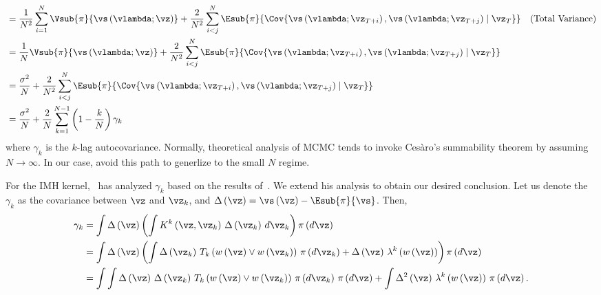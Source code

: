 \begin{proofEnd}
\begin{align}
{  } \nonumber\\
  &= \frac{1}{N^2} \sum_{i=1}^N \Vsub{\pi}{ \vs\left(\vlambda; \vz\right) } 
 + \frac{2}{N^2}  \sum_{i < j}^N \Esub{\pi}{ \Cov{ \vs\left(\vlambda; \vz_{T+i}\right), \vs\left(\vlambda; \vz_{T+j}\right) \mid  \vz_T }
  }&\text{(Total Variance)} \nonumber\\
  &= \frac{1}{N} \Vsub{\pi}{ \vs\left(\vlambda; \vz\right) } 
 + \frac{2}{N^2}  \sum_{i < j}^N \Esub{\pi}{ \Cov{ \vs\left(\vlambda; \vz_{T+i}\right), \vs\left(\vlambda; \vz_{T+j}\right) \mid  \vz_T }
  } \nonumber\\
  &= \frac{\sigma^2}{N}
 + \frac{2}{N^2}  \sum_{i < j}^N \Esub{\pi}{ \Cov{ \vs\left(\vlambda; \vz_{T+i}\right), \vs\left(\vlambda; \vz_{T+j}\right) \mid  \vz_T }
  } \nonumber\\
  &= \frac{\sigma^2}{N}
 + \frac{2}{N} \sum_{k=1}^{N-1} \left(1 - \frac{k}{N}\right) \gamma_k \label{eq:seq_cov}
\end{align}
where \(\gamma_k\) is the \(k\)-lag autocovariance.
Normally, theoretical analysis of MCMC tends to invoke Ces\`aro's summability theorem by assuming \(N \rightarrow \infty\).
In our case, avoid this path to generlize to the small \(N\) regime.

For the IMH kernel,~\citet{tan_monte_2006} has analyzed \(\gamma_k\) based on the results of~\citet{Smith96exacttransition}.
We extend his analysis to obtain our desired conclusion.
Let us denote the \(\gamma_k\) as the covariance between \(\vz\) and \(\vz_k\), and \(\Delta \left(\vz\right) = \vs\left(\vz\right) - \Esub{\pi}{\vs}\).
Then,
\begin{align}
  \gamma_k
  &= \int \Delta\left(\vz\right) \left(
  \int K^k\left(\vz, \vz_k \right) \, \Delta\left(\vz_k\right) \, d\vz_k
  \right) \pi\left(d\vz\right) 
  \\
  &=
  \int \Delta\left(\vz\right)
  \left(
  \int \Delta\left(\vz_k\right) \,
  T_k\left(w\left(\vz\right) \vee w\left(\vz_k\right) \right) \, \pi\left(d\vz_k\right)
  + \Delta\left(\vz\right) \, \lambda^k\left(w\left(\vz\right)\right)
  \right) \pi\left(d\vz\right)
  \\
  &=
  \int \int
  \Delta\left(\vz\right) \,
  \Delta\left(\vz_k\right) \,
  T_k\left(w\left(\vz\right) \vee w\left(\vz_k\right) \right) \, \pi\left(d\vz_k\right) \, \pi\left(d\vz\right)
  +
  \int
  \Delta^2\left(\vz\right) \, \lambda^k\left(w\left(\vz\right)\right) \, \pi\left(d\vz\right).
\end{align}


\end{proofEnd}
